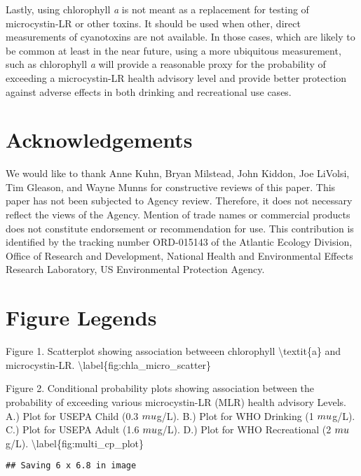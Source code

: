 \documentclass[10pt,a4paper,twocolumn]{article}
\begin{document}
Lastly, using chlorophyll \emph{a} is not meant as a replacement for
testing of microcystin-LR or other toxins. It should be used when other,
direct measurements of cyanotoxins are not available. In those cases,
which are likely to be common at least in the near future, using a more
ubiquitous measurement, such as chlorophyll \emph{a} will provide a
reasonable proxy for the probability of exceeding a microcystin-LR
health advisory level and provide better protection against adverse
effects in both drinking and recreational use cases.

\section{Acknowledgements}\label{acknowledgements}

We would like to thank Anne Kuhn, Bryan Milstead, John Kiddon, Joe
LiVolsi, Tim Gleason, and Wayne Munns for constructive reviews of this
paper. This paper has not been subjected to Agency review. Therefore, it
does not necessary reflect the views of the Agency. Mention of trade
names or commercial products does not constitute endorsement or
recommendation for use. This contribution is identified by the tracking
number ORD-015143 of the Atlantic Ecology Division, Office of Research
and Development, National Health and Environmental Effects Research
Laboratory, US Environmental Protection Agency.

\newpage

\section{Figure Legends}\label{figure-legends}

Figure 1. Scatterplot showing association betweeen chlorophyll
\textbackslash{}textit\{a\} and microcystin-LR.
\textbackslash{}label\{fig:chla\_micro\_scatter\}

Figure 2. Conditional probability plots showing association between the
probability of exceeding various microcystin-LR (MLR) health advisory
Levels. A.) Plot for USEPA Child (0.3 \(\\mu\)g/L). B.) Plot for WHO
Drinking (1 \(\\mu\)g/L). C.) Plot for USEPA Adult (1.6 \(\\mu\)g/L).
D.) Plot for WHO Recreational (2 \(\\mu\)g/L).
\textbackslash{}label\{fig:multi\_cp\_plot\}

\begin{verbatim}
## Saving 6 x 6.8 in image
\end{verbatim}
\end{document}
